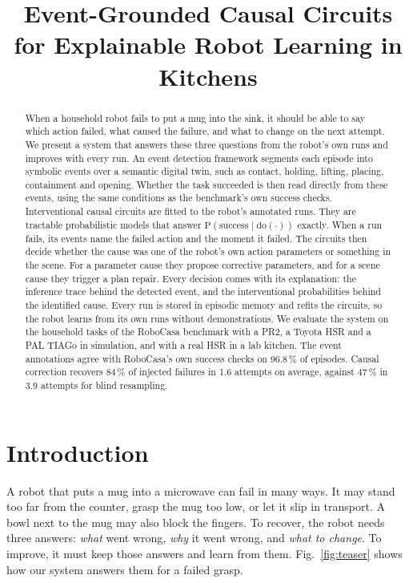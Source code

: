 \documentclass[letterpaper, 10 pt, conference]{ieeeconf}
\title{\LARGE \bf
Event-Grounded Causal Circuits for Explainable Robot Learning in Kitchens
}
\author{}
\newcommand{\dummystyle}{\color{dummy}}
\newcommand{\dummystyle}{}
\newcommand{\dummy}[1]{{\dummystyle #1}}
\newcommand{\robocasa}{RoboCasa}
\newcommand{\pr}{\mathrm{P}}
\newcommand{\dop}{\mathrm{do}}
\begin{document}
\maketitle
\thispagestyle{empty}
\pagestyle{empty}

\begin{abstract}
When a household robot fails to put a mug into the sink, it should be able to
say which action failed, what caused the failure, and what to change on the
next attempt. We present a system that answers these three questions from the
robot's own runs and improves with every run. An event detection framework
segments each episode into symbolic events over a semantic digital twin, such
as contact, holding, lifting, placing, containment and opening. Whether the
task succeeded is then read directly from these events, using the same
conditions as the benchmark's own success checks. Interventional causal circuits
are fitted to the robot's annotated runs. They are tractable probabilistic
models that answer $\pr(\text{success} \mid \dop(\cdot))$ exactly. When a run
fails, its events name the failed action and the moment it failed. The circuits
then decide whether the cause was one of the robot's own action parameters or
something in the scene. For a parameter cause they propose corrective
parameters, and for a scene cause they trigger a plan repair. Every decision
comes with its explanation: the inference trace behind the detected event, and
the interventional probabilities behind the identified cause. Every run is stored in
episodic memory and refits the circuits, so the robot learns from its own runs
without demonstrations. We evaluate the system on the household tasks of the
\robocasa{} benchmark with a PR2, a Toyota HSR and a PAL TIAGo in simulation,
and with a real HSR in a lab kitchen. The event annotations agree with
\robocasa{}'s own success checks on \dummy{96.8}\,\% of episodes. Causal
correction recovers \dummy{84}\,\% of injected failures in \dummy{1.6} attempts
on average, against \dummy{47}\,\% in \dummy{3.9} attempts for blind
resampling.
\end{abstract}

\section{Introduction}
\label{sec:introduction}

A robot that puts a mug into a microwave can fail in many ways. It
may stand too far from the counter, grasp the mug too low, or let it slip in
transport. A bowl next to the mug may also block the fingers. To recover, the
robot needs three answers: \emph{what} went wrong, \emph{why} it went wrong, and
\emph{what to change}. To improve, it must keep those answers and learn from
them. Fig.~\ref{fig:teaser} shows how our system answers them for a failed
grasp.
\end{document}
